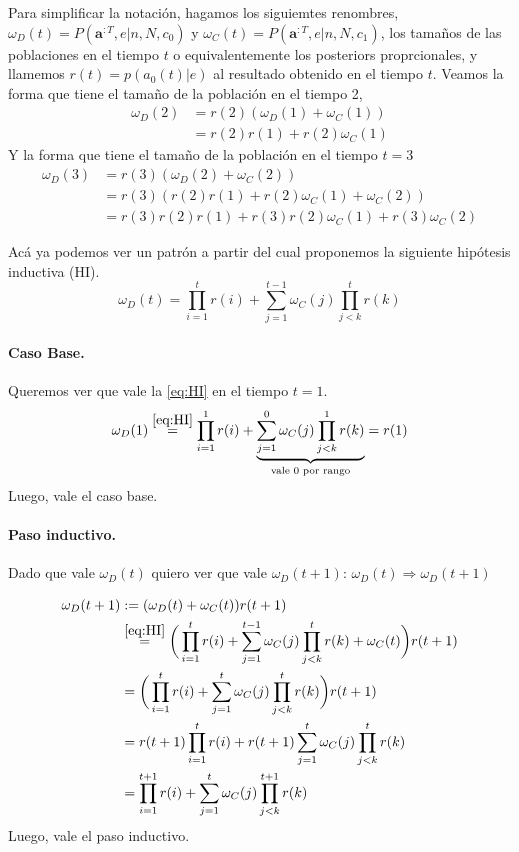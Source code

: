 \documentclass[a4paper,10pt]{article}
\begin{document}
{%

Para simplificar la notación, hagamos los siguiemtes renombres, $\omega_D(t) = P(\bm{a}^{:T},e|n,N, c_0)$ y $\omega_C(t) = P(\bm{a}^{:T},e|n,N, c_1)$, los tamaños de las poblaciones en el tiempo $t$ o equivalentemente los posteriors proprcionales, y llamemos $r(t) =p(a_0(t)|e) $ al resultado obtenido en el tiempo $t$.
Veamos la forma que tiene el tamaño de la población en el tiempo 2,
\begin{align}
\omega_D(2) & = r(2) ( \omega_D(1) + \omega_C(1) ) \\
& = r(2)r(1) + r(2)\omega_C(1)
\end{align}
Y la forma que tiene el tamaño de la población en el tiempo $t=3$
\begin{align}
\omega_D(3) & = r(3) (\omega_D(2)+\omega_C(2)) \\
& = r(3) (r(2)r(1) + r(2)\omega_C(1) + \omega_C(2) ) \\
& = r(3)r(2)r(1) + r(3)r(2)\omega_C(1) + r(3)\omega_C(2) 
\end{align}

Acá ya podemos ver un patrón a partir del cual proponemos la siguiente hipótesis inductiva (HI).
\begin{equation} \label{eq:HI} \tag{HI} 
\omega_D(t) = \prod^t_{i=1} r(i) + \sum^{t-1}_{j=1} \omega_C(j)
\prod^t_{j<k} r(k)
\end{equation}

\paragraph{Caso Base.} Queremos ver que vale la \ref{eq:HI} en el tiempo $t=1$.
\begin{equation} 
\omega_D(1) \overset{\ref{eq:HI}}{=} \prod^1_{i=1} r(i) + \underbrace{\sum^{0}_{j=1} \omega_C(j) \prod^1_{j<k} r(k) }_{\text{vale $0$ por rango}} = r(1)
\end{equation}
Luego, vale el caso base.

\paragraph{Paso inductivo.} Dado que vale $\omega_D(t)$ quiero ver que vale $\omega_D(t+1)$: $\omega_D(t) \Rightarrow \omega_D(t+1)$

\begin{equation}
\begin{split}
\omega_D(t+1) &:= (\omega_D(t) + \omega_C(t)) r(t+1)  \\
& \overset{\ref{eq:HI}}{=} \bigg( \prod^t_{i=1} r(i) + \sum^{t-1}_{j=1} \omega_C(j) \prod^t_{j<k} r(k) + \omega_C(t) \bigg) r(t+1) \\
& = \bigg( \prod^t_{i=1} r(i) + \sum^{t}_{j=1} \omega_C(j) \prod^t_{j<k} r(k)\bigg) r(t+1) \\
& = r(t+1) \prod^t_{i=1} r(i) + r(t+1) \sum^{t}_{j=1}  \omega_C(j) \prod^t_{j<k} r(k) \\ 
& = \prod^{t+1}_{i=1} r(i) + \sum^{t}_{j=1}  \omega_C(j) \prod^{t+1}_{j<k} r(k) \\
\end{split}
\end{equation}
Luego, vale el paso inductivo. \\

}
\end{document}
